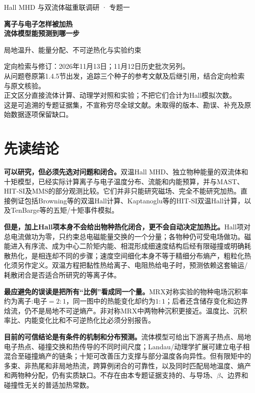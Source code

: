 \documentclass[UTF8,a4paper,11pt,openany,fontset=fandol]{ctexbook}
\begin{document}
\frontmatter
\begin{titlepage}
\vspace*{20mm}
{\sffamily\Large Hall MHD 与双流体磁重联调研 · 专题一\par}
\vspace{12mm}
{\sffamily\Huge\bfseries\color{ink}离子与电子怎样被加热\\[8pt]流体模型能预测到哪一步\par}
\vspace{12mm}
{\Large 局地温升、能量分配、不可逆热化与实验约束\par}
\vfill
定向检索与修订：2026年11月13日；11月12日历史批次另列。\\[6pt]
从问题卷原第1.4.5节出发，追踪三个种子的参考文献及后继引用，结合定向检索与原文核验。\\[6pt]
正文区分直接流体计算、动理学对照和实验；不把它们合计为Hall模拟次数。\\[6pt]
这是可追溯的专题证据集，不宣称穷尽全球文献。未取得的版本、勘误、补充及原始数据逐项保留缺口。\\[6pt]

\end{titlepage}
\chapter*{先读结论}
\textbf{可以研究，但必须先选对问题和闭合。}双温Hall MHD、独立物种能量的双流体和十矩模型，已经实际计算离子与电子温度分布、流能和内能预算，并与MAST、HIT-SI及MMS的部分观测比较。它们并非只能研究磁场、完全不能研究加热。直接例证包括Browning等的双温Hall计算、Kaptanoglu等的HIT-SI双温Hall计算，以及TenBarge等的五矩/十矩事件模拟。\citep{L223,Kaptanoglu2020,TenBarge2019MMS}

\textbf{但是，加上Hall项本身不会给出物种热化闭合，更不会自动决定加热比。}Hall项对总电流做功为零，只约束总电磁能量交换的一个分量；各物种仍可受电场做功。磁能进入有序流、成为中心二阶矩内能、相混形成细速度结构后经有限碰撞或明确耗散热化，是相连却不同的步骤；速度空间细化本身不等于精细分布熵产，粗粒化热化须另作定义。双温方程把黏性热给离子、电阻热给电子时，预测依赖这套输运/耗散闭合是否适合所研究的等离子体。

\textbf{最应避免的误读是把所有“比例”看成同一个量。}MRX对称实验的物种电场沉积率约为离子:电子$=2:1$，同一图中的热能变化却约为$1:1$；后者还含储存变化和边界焓流，仍不是局地不可逆熵产。非对称MRX中两物种沉积更接近。温度比、沉积率比、内能变化比和不可逆热化比必须分别报告。\citep{F674,Yoo2017Heating}

\textbf{目前的可信结论是有条件的机制和分布预测。}流体模型可给出下游离子热点、局地电子热点、碰撞交换和热传导的不同时间尺度；Landau/动理学扩展可建立电子相混合至碰撞熵产的链条；十矩可改善压力支撑与部分温度各向异性。但有限矩中的多束、非热尾和非局地热流，跨算例闭合的可靠性，以及同时匹配局地温度、熵产和两物种分配，仍有实质缺口。不存在由本专题证据支持的、与导场、$\beta$、边界和碰撞性无关的普适加热常数。
\end{document}

